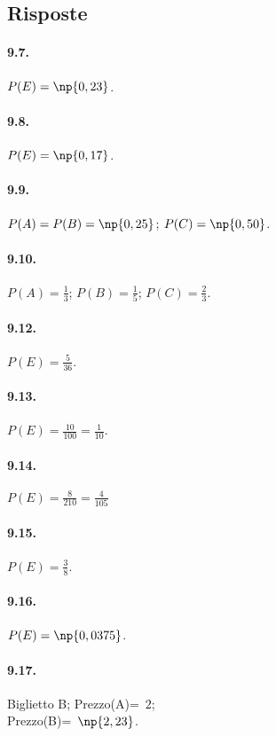 \subsection{Risposte}
\begin{multicols}{2}

\paragraph{9.7.} $P(E)=\np{0,23}$.

\paragraph{9.8.} $P(E)=\np{0,17}$.

\paragraph{9.9.} $P(A)=P(B)=\np{0,25}$; $P(C)=\np{0,50}$.

\paragraph{9.10.} $ P(A)=\frac{1}{3}$; $P(B)=\frac{1}{5}$; $P(C)=\frac{2}{3} $.

\paragraph{9.12.} $P(E)=\frac 5{36}$.

\paragraph{9.13.} $P(E)=\frac{10}{100}=\frac 1{10}$.

\paragraph{9.14.} $P(E)=\frac 8{210}=\frac 4{105}$

\paragraph{9.15.} $P(E)=\frac 3 8$.

\paragraph{9.16.} $P(E)=\np{0,0375}$.

\paragraph{9.17.} Biglietto B; Prezzo(A)=\officialeuro~$2$;\protect\\ Prezzo(B)=\officialeuro~$\np{2,23}$.


\end{multicols}
